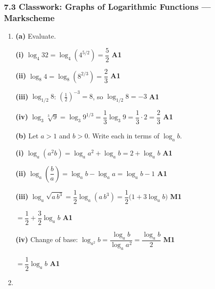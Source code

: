 \documentclass[12pt, twoside]{article}
\begin{document}
\subsubsection*{7.3 Classwork: Graphs of Logarithmic Functions --- Markscheme}

\begin{enumerate}[itemsep=0.3cm]

\item[1.] [Maximum mark: 10]

\textbf{(a)} Evaluate.

\textbf{(i)} $\log_4 32 = \log_4 (4^{5/2}) = \dfrac{5}{2}$ \hfill \textbf{A1}

\medskip

\textbf{(ii)} $\log_8 4 = \log_8 (8^{2/3}) = \dfrac{2}{3}$ \hfill \textbf{A1}

\medskip

\textbf{(iii)} $\log_{1/2} 8$: \quad $\left(\tfrac{1}{2}\right)^{-3} = 8$, so
$\log_{1/2} 8 = -3$ \hfill \textbf{A1}

\medskip

\textbf{(iv)} $\log_3 \sqrt[3]{9} = \log_3 9^{1/3} = \dfrac{1}{3}\log_3 9
= \dfrac{1}{3}\cdot 2 = \dfrac{2}{3}$ \hfill \textbf{A1}

\medskip

\textbf{(b)} Let $a > 1$ and $b > 0$. Write each in terms of $\log_a b$.

\textbf{(i)} $\log_a (a^2 b) = \log_a a^2 + \log_a b = 2 + \log_a b$
\hfill \textbf{A1}

\medskip

\textbf{(ii)} $\log_a \!\left(\dfrac{b}{a}\right) = \log_a b - \log_a a
= \log_a b - 1$ \hfill \textbf{A1}

\medskip

\textbf{(iii)} $\log_a \sqrt{a\, b^3} = \dfrac{1}{2}\log_a (a\, b^3)
= \dfrac{1}{2}\bigl(1 + 3 \log_a b\bigr)$ \hfill \textbf{M1}

$= \dfrac{1}{2} + \dfrac{3}{2}\log_a b$ \hfill \textbf{A1}

\medskip

\textbf{(iv)} Change of base: $\log_{a^2} b = \dfrac{\log_a b}{\log_a a^2}
= \dfrac{\log_a b}{2}$ \hfill \textbf{M1}

$= \dfrac{1}{2}\log_a b$ \hfill \textbf{A1}

\newpage

\item[2.] [Maximum mark: 9]


\end{enumerate}
\end{document}
